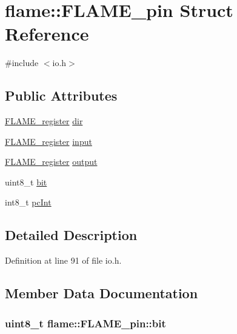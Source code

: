 \hypertarget{structflame_1_1_f_l_a_m_e__pin}{\section{flame\-:\-:F\-L\-A\-M\-E\-\_\-pin Struct Reference}
\label{structflame_1_1_f_l_a_m_e__pin}
}


{\ttfamily \#include $<$io.\-h$>$}

\subsection*{Public Attributes}
\begin{DoxyCompactItemize}
\item 
\hyperlink{namespaceflame_a7117d3cded694c1ded03c462d677b165}{F\-L\-A\-M\-E\-\_\-register} \hyperlink{structflame_1_1_f_l_a_m_e__pin_af270bfbe697774b7efdcd1e5fca607ca}{dir}
\item 
\hyperlink{namespaceflame_a7117d3cded694c1ded03c462d677b165}{F\-L\-A\-M\-E\-\_\-register} \hyperlink{structflame_1_1_f_l_a_m_e__pin_ac183e7bd5580c27281bd90f5e5f90e75}{input}
\item 
\hyperlink{namespaceflame_a7117d3cded694c1ded03c462d677b165}{F\-L\-A\-M\-E\-\_\-register} \hyperlink{structflame_1_1_f_l_a_m_e__pin_aa7a88c3c95421bf3c9a7858b6f6f7709}{output}
\item 
uint8\-\_\-t \hyperlink{structflame_1_1_f_l_a_m_e__pin_a0b048d9ad09e0388d1e141294a8fd47f}{bit}
\item 
int8\-\_\-t \hyperlink{structflame_1_1_f_l_a_m_e__pin_a42329feb988c345b2a76d6c3c1c7e7f7}{pc\-Int}
\end{DoxyCompactItemize}


\subsection{Detailed Description}


Definition at line 91 of file io.\-h.



\subsection{Member Data Documentation}
\hypertarget{structflame_1_1_f_l_a_m_e__pin_a0b048d9ad09e0388d1e141294a8fd47f}{
\subsubsection[{bit}]{\setlength{\rightskip}{0pt plus 5cm}uint8\-\_\-t flame\-::\-F\-L\-A\-M\-E\-\_\-pin\-::bit}}\label{structflame_1_1_f_l_a_m_e__pin_a0b048d9ad09e0388d1e141294a8fd47f}



